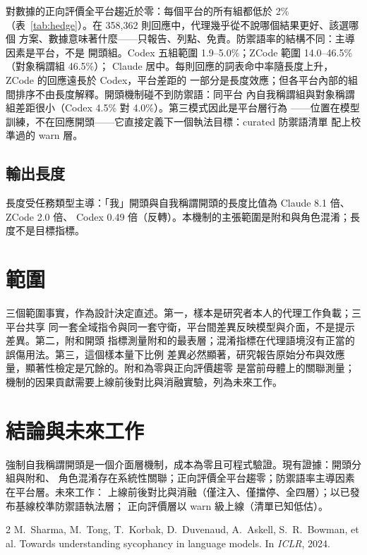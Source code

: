 \documentclass[10pt,twocolumn]{article}
\begin{document}
對數據的正向評價全平台趨近於零：每個平台的所有組都低於 2\%
（表~\ref{tab:hedge}）。在 358{,}362 則回應中，代理幾乎從不說哪個結果更好、該選哪個
方案、數據意味著什麼——只報告、列點、免責。防禦語率的結構不同：主導因素是平台，不是
開頭組。Codex 五組範圍 1.9--5.0\%；ZCode 範圍 14.0--46.5\%（對象稱謂組 46.5\%）；
Claude 居中。每則回應的詞表命中率隨長度上升，ZCode 的回應遠長於 Codex，平台差距的
一部分是長度效應；但各平台內部的組間排序不由長度解釋。開頭機制碰不到防禦語：同平台
內自我稱謂組與對象稱謂組差距很小（Codex 4.5\% 對 4.0\%）。第三模式因此是平台層行為
——位置在模型訓練，不在回應開頭——它直接定義下一個執法目標：curated 防禦語清單
配上校準過的 warn 層。

\subsection{輸出長度}
長度受任務類型主導：「我」開頭與自我稱謂開頭的長度比值為 Claude 8.1 倍、ZCode 2.0 倍、
Codex 0.49 倍（反轉）。本機制的主張範圍是附和與角色混淆；長度不是目標指標。

\section{範圍}
三個範圍事實，作為設計決定直述。第一，樣本是研究者本人的代理工作負載；三平台共享
同一套全域指令與同一套守衛，平台間差異反映模型與介面，不是提示差異。第二，附和開頭
指標測量附和的最表層；混淆指標在代理語境沒有正當的誤傷用法。第三，這個樣本量下比例
差異必然顯著，研究報告原始分布與效應量，顯著性檢定是冗餘的。附和為零與正向評價趨零
是當前母體上的關聯測量；機制的因果貢獻需要上線前後對比與消融實驗，列為未來工作。

\section{結論與未來工作}
強制自我稱謂開頭是一個介面層機制，成本為零且可程式驗證。現有證據：開頭分組與附和、
角色混淆存在系統性關聯；正向評價全平台趨零；防禦語率主導因素在平台層。未來工作：
上線前後對比與消融（僅注入、僅擋停、全四層）；以已發布基線校準防禦語執法層；
正向評價層以 warn 級上線（清單已知低估）。

\begin{thebibliography}{2}
M.~Sharma, M.~Tong, T.~Korbak, D.~Duvenaud, A.~Askell, S.~R.~Bowman, et al.
\newblock Towards understanding sycophancy in language models.
\newblock In \emph{ICLR}, 2024.
\end{thebibliography}
\end{document}
